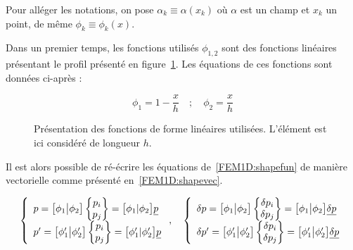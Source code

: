 Pour alléger les notations, on pose $\alpha_k\equiv \alpha(x_k)$ où $\alpha$ est un champ et $x_k$ un point, de même
$\phi_k\equiv\phi_k(x)$.

Dans un premier temps, les fonctions utilisés $\phi_{1,2}$ sont des fonctions linéaires présentant le profil présenté en
figure~\ref{fig:FEM:lin_shape_fun}. Les équations de ces fonctions sont données ci-après :

\begin{equation*}
	\phi_1 = 1-\frac{x}{h} \quad;\quad \phi_2 = \frac{x}{h}
\end{equation*}

\begin{figure}[!ht]
	\centering
	
	\caption{\label{fig:FEM:lin_shape_fun}Présentation des fonctions de forme linéaires utilisées. L'élément est ici considéré
	de longueur $h$.}
\end{figure}


Il est alors possible de ré-écrire les équations de~\eqref{FEM1D:shapefun} de manière vectorielle comme présenté
en~\eqref{FEM1D:shapevec}.

\begin{equation}
	\left\{\begin{array}{l}
        p = \big[\phi_1\big|\phi_2\big]\begin{Bmatrix}p_i\\p_j\end{Bmatrix} = \big[\phi_1|\phi_2\big]\underline{p}\\
		p' = \big[\phi_1'\big|\phi_2'\big]\begin{Bmatrix}p_i\\p_j\end{Bmatrix} = \big[\phi_1'|\phi_2'\big]\underline{p}\\
	\end{array}\right.,\quad
	\left\{\begin{array}{l}
        \delta p = \big[\phi_1\big|\phi_2\big]\begin{Bmatrix}\delta p_i\\\delta p_j\end{Bmatrix} = \big[\phi_1\big|\phi_2\big]\underline{\delta p}\\
		\delta p' = \big[\phi_1'\big|\phi_2'\big]\begin{Bmatrix}\delta p_i\\\delta p_j\end{Bmatrix} = \big[\phi_1'\big|\phi_2'\big]\underline{\delta p}\\
	\end{array}\right.\label{FEM1D:shapevec}
\end{equation}

